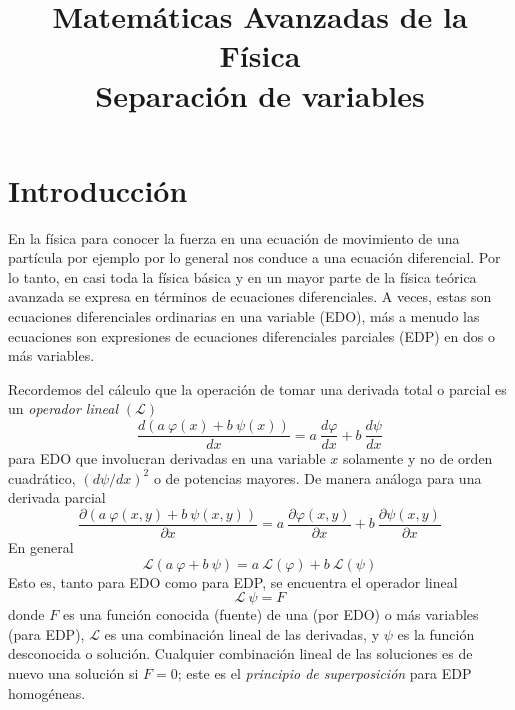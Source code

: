 
\title{Matemáticas Avanzadas de la Física \\ {\large Separación de variables}}
\date{ }

\renewcommand\labelenumii{\theenumi.{\arabic{enumii}}}
\maketitle
\fontsize{14}{14}\selectfont
\section{Introducción}
En la física para conocer la fuerza en una ecuación de movimiento de una partícula por ejemplo por lo general nos conduce a una ecuación diferencial. Por lo tanto, en casi toda la física básica y en un mayor parte de la física teórica avanzada se expresa en términos de ecuaciones diferenciales. A veces, estas son ecuaciones diferenciales ordinarias en una variable (EDO), más a menudo las ecuaciones son expresiones de ecuaciones diferenciales parciales (EDP) en dos o más variables.
\par
Recordemos del cálculo que la operación de tomar una derivada total o parcial es un \emph{operador lineal} $(\mathcal{L})$
\[ \dfrac{d(a \: \varphi(x) + b \: \psi (x))}{dx} = a \: \dfrac{d \varphi}{dx} +  b \: \dfrac{d \psi}{dx} \]
para EDO que involucran derivadas en una variable $x$ solamente y no de orden cuadrático, $(d \psi / dx)^{2}$ o de potencias mayores. De manera análoga para una derivada parcial
\[ \dfrac{\partial ( a \: \varphi(x, y) + b \: \psi(x,y))}{\partial x} = a \: \dfrac{\partial \varphi(x, y)}{\partial x} + b \: \dfrac{\partial \psi(x, y)}{\partial x}  \]
En general
\[ \mathcal{L} (a \: \varphi +  b \: \psi ) = a \: \mathcal{L}(\varphi) +  b \: \mathcal{L} (\psi)  \]
Esto es, tanto para EDO como para EDP, se encuentra el operador lineal
\begin{equation}
\mathcal{L} \: \psi = F
\end{equation}
donde $F$ es una función conocida (fuente) de una (por EDO) o más variables (para EDP), $\mathcal{L}$ es una combinación lineal de las derivadas, y $\psi$ es la función desconocida o solución. Cualquier combinación lineal de las soluciones es de nuevo una solución si $F = 0$; este es el \emph{principio de superposición} para EDP homogéneas.
\\
